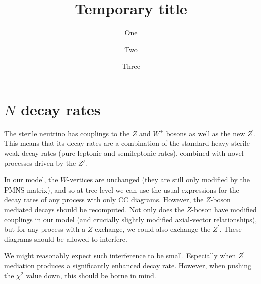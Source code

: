 \documentclass[11pt, a4paper]{article}
\title{Temporary title}
\author{One}
\author{Two}
\author{Three}
\affiliation{Institute for Particle Physics Phenomenology, Department of
Physics, Durham University, South Road, Durham DH1 3LE, United Kingdom}
\begin{document}
 


\section{$N$ decay rates}

The sterile neutrino has couplings to the $Z$ and $W^\pm$ bosons as well as the
new $Z^\prime$. This means that its decay rates are a combination of the
standard heavy sterile weak decay rates (pure leptonic and semileptonic rates),
combined with novel processes driven by the $Z\prime$. 

%
%
%
%
%
In our model, the $W$-vertices are unchanged (they are still only modified by
the PMNS matrix), and so at tree-level we can use the usual expressions for the
decay rates of any process with only CC diagrams. However, the $Z$-boson mediated 
decays should be recomputed. Not only does the $Z$-boson have
modified couplings in our model (and crucially slightly modified axial-vector
relationships), but for any process with a $Z$ exchange, we could also exchange
the $Z^\prime$. These diagrams should be allowed to interfere. 

We might reasonably expect such interference to be small. Especially when
$Z^\prime$ mediation produces a significantly enhanced decay rate. However, 
when pushing the $\chi^2$ value down, this should be borne in mind.
\end{document}
